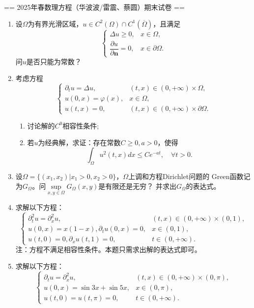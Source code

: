== 2025年春数理方程（华波波/雷震、蔡圆）期末试卷 ==
\begin{enumerate}
	\item
    设$\Omega$为有界光滑区域，$u \in C^2(\Omega) \cap C^1(\overline \Omega)$，且满足
	$$\begin{cases}
		\Delta u \geq 0, &x \in \Omega, \\
		\dfrac{\partial u}{\partial\boldsymbol{n}}=0, &x \in \partial \Omega .
	\end{cases}$$
	问$u$是否只能为常数？

	\item
    考虑方程
    $$\begin{cases}
		\partial_tu=\Delta u, &(t,x)\in (0, +\infty)\times \Omega, \\
		u(0,x)=\varphi(x), & x\in \Omega, \\
        u(t,x)=0, & (t,x)\in (0,+\infty)\times \partial \Omega .
    \end{cases}$$
    \begin{enumerate}[label=(\arabic*)]
        \item 讨论解的$C^0$相容性条件;
        \item 若$u$为经典解，求证：存在常数$C \ge 0, a \gt 0$，使得
        $$\int_\Omega u^2(t,x)dx \leq Ce^{-at}, \quad \forall t>0.$$
    \end{enumerate}

    \item
    设$\Omega=\{(x_1, x_2)|x_1 >0, x_2>0\}$，$\Omega$上调和方程Dirichlet问题的
    Green函数记为$G_{\Omega}$。问$\sup\limits_{x,y \in \Omega}G_{\Omega}(x,y)$是有限还是无穷？
    并求出$G_{\Omega}$的表达式。

    \item
    求解以下方程：
    $$\begin{cases}
		\partial^2_tu=\partial^2_xu, &(t,x)\in (0, +\infty)\times (0,1),\\
        u(0,x)=x(1-x), \partial_tu(0,x)=0, &x \in (0,1),\\
        u(t,0)=0,  \partial_xu(t,1)=0, &t\in(0,+\infty). 
    \end{cases}$$
    注：方程不满足相容性条件。本题只需求出解的表达式即可。

    \item
    求解以下方程：
    $$\begin{cases}
		\partial_tu=\partial^2_xu, &(t,x)\in (0, +\infty)\times (0,\pi),\\
        u(0,x)=\sin 3x+\sin5x, &x \in (0,\pi),\\
        u(t,0)=u(t,\pi)=0, &t\in(0,+\infty). 
    \end{cases}$$


\end{enumerate}
